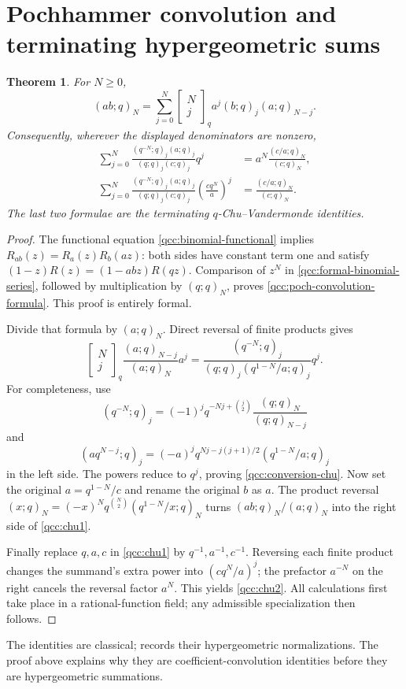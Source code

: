 \documentclass[11pt,a4paper,oneside,openany]{book}
\newtheorem{theorem}{Theorem}[chapter]
\theoremstyle{definition}
\theoremstyle{remark}
\newcommand{\GB}[3][q]{\begin{bmatrix}#2\\#3\end{bmatrix}_{#1}}
\begin{document}
\section{Pochhammer convolution and terminating hypergeometric sums}
\begin{theorem}\label{qcc:poch-convolution}
For \(N\ge0\),
\begin{equation}\label{qcc:poch-convolution-formula}
 (ab;q)_N=\sum_{j=0}^N\GB Nj a^j(b;q)_j(a;q)_{N-j}.
\end{equation}
Consequently, wherever the displayed denominators are nonzero,
\begin{align}
 \sum_{j=0}^N
 \frac{(q^{-N};q)_j(a;q)_j}{(q;q)_j(c;q)_j}q^j
 &=a^N\frac{(c/a;q)_N}{(c;q)_N},\label{qcc:chu1}\\
 \sum_{j=0}^N
 \frac{(q^{-N};q)_j(a;q)_j}{(q;q)_j(c;q)_j}
 \left(\frac{cq^N}{a}\right)^j
 &=\frac{(c/a;q)_N}{(c;q)_N}.\label{qcc:chu2}
\end{align}
The last two formulae are the terminating \(q\)-Chu--Vandermonde identities.
\end{theorem}
\begin{proof}
The functional equation \eqref{qcc:binomial-functional} implies
\(R_{ab}(z)=R_a(z)R_b(az)\): both sides have constant term one and satisfy
\((1-z)R(z)=(1-abz)R(qz)\).
Comparison of \(z^N\) in \eqref{qcc:formal-binomial-series}, followed by
multiplication by \((q;q)_N\), proves \eqref{qcc:poch-convolution-formula}.
This proof is entirely formal.

Divide that formula by \((a;q)_N\). Direct reversal of finite products gives
\begin{equation}\label{qcc:conversion-chu}
 \GB Nj\frac{(a;q)_{N-j}}{(a;q)_N}a^j
 =\frac{(q^{-N};q)_j}{(q;q)_j(q^{1-N}/a;q)_j}q^j.
\end{equation}
For completeness, use
\[
 (q^{-N};q)_j=(-1)^j q^{-Nj+\binom j2}\frac{(q;q)_N}{(q;q)_{N-j}}
\]
and
\[
 (aq^{N-j};q)_j=(-a)^j q^{Nj-j(j+1)/2}(q^{1-N}/a;q)_j
\]
in the left side. The powers reduce to \(q^j\), proving
\eqref{qcc:conversion-chu}.
Now set the original \(a=q^{1-N}/c\) and rename the original \(b\) as \(a\).
The product reversal
\((x;q)_N=(-x)^Nq^{\binom N2}(q^{1-N}/x;q)_N\)
turns \((ab;q)_N/(a;q)_N\) into the right side of \eqref{qcc:chu1}.

Finally replace \(q,a,c\) in \eqref{qcc:chu1} by
\(q^{-1},a^{-1},c^{-1}\). Reversing each finite product changes the summand's
extra power into \((cq^N/a)^j\); the prefactor \(a^{-N}\) on the right cancels
the reversal factor \(a^N\). This yields \eqref{qcc:chu2}.
All calculations first take place in a rational-function field; any admissible
specialization then follows.
\end{proof}
The identities are classical; \cite{dlmf176} records their hypergeometric
normalizations. The proof above explains why they are coefficient-convolution
identities before they are hypergeometric summations.
\end{document}
